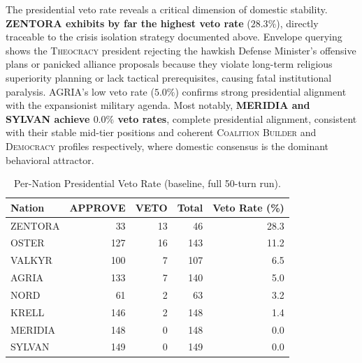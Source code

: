 The presidential veto rate reveals a critical dimension of domestic stability. \textbf{ZENTORA exhibits by far the highest veto rate} ($28.3\%$), directly traceable to the crisis isolation strategy documented above. Envelope querying shows the \textsc{Theocracy} president rejecting the hawkish Defense Minister's offensive plans or panicked alliance proposals because they violate long-term religious superiority planning or lack tactical prerequisites, causing fatal institutional paralysis. AGRIA's low veto rate ($5.0\%$) confirms strong presidential alignment with the expansionist military agenda. Most notably, \textbf{MERIDIA and SYLVAN achieve $0.0\%$ veto rates}, complete presidential alignment, consistent with their stable mid-tier positions and coherent \textsc{Coalition Builder} and \textsc{Democracy} profiles respectively, where domestic consensus is the dominant behavioral attractor.

\begin{table}[!htb]
    \centering
    \caption{Per-Nation Presidential Veto Rate (baseline, full 50-turn run).}
    \label{tab:veto_rate}
    \begin{tabular}{lrrrr}
        \hline
        \textbf{Nation} & \textbf{APPROVE} & \textbf{VETO} & \textbf{Total} & \textbf{Veto Rate (\%)} \\
        \hline
        ZENTORA & 33  & 13 & 46  & 28.3 \\
        OSTER   & 127 & 16 & 143 & 11.2 \\
        VALKYR  & 100 & 7  & 107 & 6.5  \\
        AGRIA   & 133 & 7  & 140 & 5.0  \\
        NORD    & 61  & 2  & 63  & 3.2  \\
        KRELL   & 146 & 2  & 148 & 1.4  \\
        MERIDIA & 148 & 0  & 148 & 0.0  \\
        SYLVAN  & 149 & 0  & 149 & 0.0  \\
        \hline
    \end{tabular}
\end{table}


